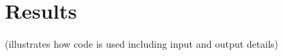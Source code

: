 \section{Results}
\label{sec:results}
(illustrates how code is used including input and output details)
